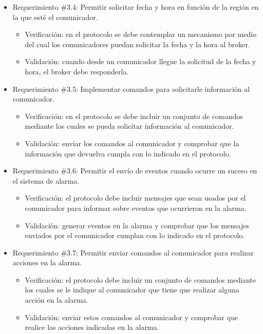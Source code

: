 \documentclass[
11pt, %
codirector, %
]{charter}
\begin{document}
\begin{itemize}
	\item Requerimiento \#3.4: Permitir solicitar fecha y hora en función de la región en la que esté el comunicador.
	\begin{itemize}
		\item Verificación: en el protocolo se debe contemplar un mecanismo por medio del cual los comunicadores puedan solicitar la fecha y la hora al broker.
		\item Validación: cuando desde un comunicador llegue la solicitud de la fecha y hora, el broker debe responderla.
	\end{itemize}
			
	\item Requerimiento \#3.5: Implementar comandos para solicitarle información al comunicador.
	\begin{itemize}
		\item Verificación: en el protocolo se debe incluir un conjunto de comandos mediante los cuales se pueda solicitar información al comunicador.
		\item Validación: enviar los comandos al comunicador y comprobar que la información que devuelva cumpla con lo indicado en el protocolo.
	\end{itemize}
			
	\item Requerimiento \#3.6: Permitir el envío de eventos cuando ocurre un suceso en el sistema de alarma.
	\begin{itemize}
		\item Verificación: el protocolo debe incluir mensajes que sean usados por el comunicador  para informar sobre eventos que ocurrieron en la alarma.
		\item Validación: generar eventos en la alarma y comprobar que los mensajes enviados por el comunicador cumplan con lo indicado en el protocolo.
	\end{itemize}
			
	\item Requerimiento \#3.7: Permitir enviar comandos al comunicador para realizar acciones en la alarma.
	\begin{itemize}
		\item Verificación: el protocolo debe incluir un conjunto de comandos mediante los cuales se le indique al comunicador que tiene que realizar alguna acción en la alarma.
		\item Validación: enviar estos comandos al comunicador y comprobar que realice las acciones indicadas en la alarma.
	\end{itemize}
			

\end{itemize}
\end{document}
